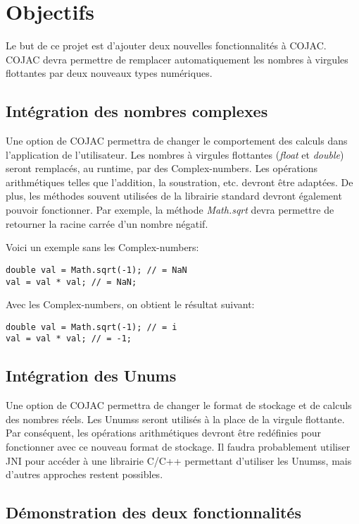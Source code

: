 \section{Objectifs}

Le but de ce projet est d'ajouter deux nouvelles fonctionnalités à \gls{COJAC}. \gls{COJAC} devra permettre de remplacer automatiquement les nombres à virgules flottantes par deux nouveaux types numériques.

\subsection{Intégration des nombres complexes}

Une option de \gls{COJAC} permettra de changer le comportement des calculs dans l'application de l'utilisateur. Les nombres à virgules flottantes (\textit{float} et \textit{double}) seront remplacés, au runtime, par des \glspl{Complex-number}. Les opérations arithmétiques telles que l'addition, la soustration, etc. devront être adaptées. De plus, les méthodes souvent utilisées de la librairie standard devront également pouvoir fonctionner. Par exemple, la méthode \textit{Math.sqrt} devra permettre de retourner la racine carrée d'un nombre négatif.

Voici un exemple sans les \glspl{Complex-number}:
\begin{verbatim}
double val = Math.sqrt(-1); // = NaN
val = val * val; // = NaN;
\end{verbatim}

Avec les \glspl{Complex-number}, on obtient le résultat suivant:
\begin{verbatim}
double val = Math.sqrt(-1); // = i
val = val * val; // = -1;
\end{verbatim}

\subsection{Intégration des Unums}

Une option de \gls{COJAC} permettra de changer le format de stockage et de calculs des nombres réels. Les \glspl{Unums} seront utilisés à la place de la virgule flottante. Par conséquent, les opérations arithmétiques devront être redéfinies pour fonctionner avec ce nouveau format de stockage. Il faudra probablement utiliser \gls{JNI} pour accéder à une librairie C/C++ permettant d'utiliser les \glspl{Unums}, mais d'autres approches restent possibles.

\subsection{Démonstration des deux fonctionnalités}

